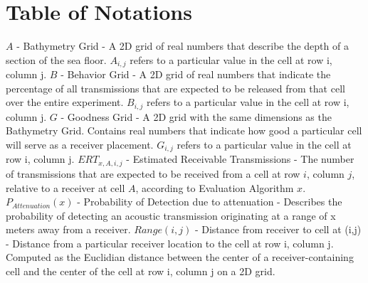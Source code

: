 
\chapter{Table of Notations}
$A$ - Bathymetry Grid - A 2D grid of real numbers that describe the depth of a section of the sea floor.  $A_{i,j}$ refers to a particular value in the cell at row i, column j.
\newline
\newline
$B$ - Behavior Grid - A 2D grid of real numbers that indicate the percentage of all transmissions that are expected to be released from that cell over the entire experiment.  $B_{i,j}$ refers to a particular value in the cell at row i, column j.
\newline
\newline
$G$ - Goodness Grid - A 2D grid with the same dimensions as the Bathymetry Grid.  Contains real numbers that indicate how good a particular cell will serve as a receiver placement.  $G_{i,j}$ refers to a particular value in the cell at row i, column j.
\newline
\newline
$ERT_{x,A,i,j}$ - Estimated Receivable Transmissions - The number of transmissions that are expected to be received from a cell at row $i$, column $j$, relative to a receiver at cell $A$, according to Evaluation Algorithm $x$.
\newline
\newline
$P_{Attenuation}(x)$ - Probability of Detection due to attenuation - Describes the probability of detecting an acoustic transmission originating at a range of x meters away from a receiver.
\newline
\newline
$Range(i,j)$ - Distance from receiver to cell at (i,j) - Distance from a particular receiver location to the cell at row i, column j.  Computed as the Euclidian distance between the center of a receiver-containing cell and the center of the cell at row i, column j on a 2D grid.

